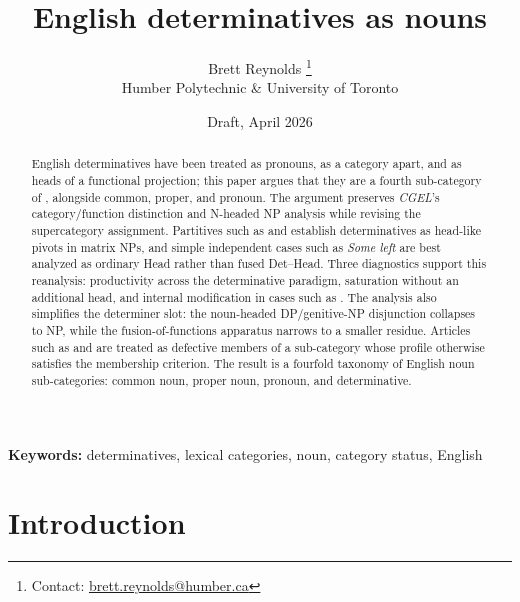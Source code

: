 \documentclass[12pt]{article}
\title{English determinatives as nouns}
\author{Brett Reynolds \orcidlink{0000-0003-0073-7195}%
\thanks{Contact: \href{mailto:brett.reynolds@humber.ca}{brett.reynolds@humber.ca}}\\
Humber Polytechnic \& University of Toronto}
\date{Draft, April 2026}
\begin{document}
\maketitle

\begin{abstract}
English determinatives have been treated as pronouns, as a category apart, and as heads of a functional projection; this paper argues that they are a fourth sub-category of , alongside common, proper, and pronoun. The argument preserves \textit{CGEL}'s category/function distinction and N-headed NP analysis while revising the supercategory assignment. Partitives such as  and  establish determinatives as head-like pivots in matrix NPs, and simple independent cases such as \textit{Some left} are best analyzed as ordinary Head rather than fused Det--Head. Three diagnostics support this reanalysis: productivity across the determinative paradigm, saturation without an additional head, and internal modification in cases such as . The analysis also simplifies the determiner slot: the noun-headed DP/genitive-NP disjunction collapses to NP, while the fusion-of-functions apparatus narrows to a smaller residue. Articles such as  and  are treated as defective members of a sub-category whose profile otherwise satisfies the membership criterion. The result is a fourfold taxonomy of English noun sub-categories: common noun, proper noun, pronoun, and determinative.
\end{abstract}

\noindent\textbf{Keywords:} determinatives, lexical categories, noun, category status, English

\section{Introduction}\label{sec:intro}
\end{document}

